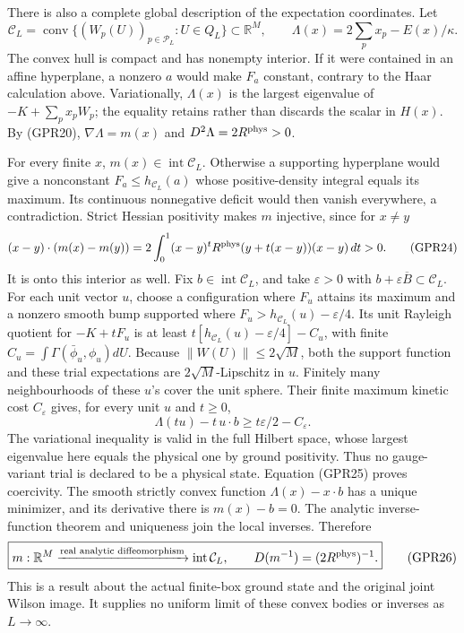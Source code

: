 \documentclass[11pt]{article}
\begin{document}
There is also a complete global description of the expectation coordinates. Let
\[
 \mathcal C_L=\operatorname{conv}\{(W_p(U))_{p\in\mathcal P_L}:U\in Q_L\}\subset\mathbb R^M,
 \qquad \Lambda(x)=2\sum_px_p-E(x)/\kappa.
 \tag{GPR23}
\]
The convex hull is compact and has nonempty interior. If it were contained in an affine hyperplane, a nonzero \(a\) would make \(F_a\) constant, contrary to the Haar calculation above. Variationally, \(\Lambda(x)\) is the largest eigenvalue of \(-K+\sum_px_pW_p\); the equality retains rather than discards the scalar in \(H(x)\). By (GPR20), \(\nabla\Lambda=m(x)\) and \(D^2\Lambda=2R^{\rm phys}>0\).

For every finite \(x\), \(m(x)\in\operatorname{int}\mathcal C_L\). Otherwise a supporting hyperplane would give a nonconstant \(F_a\le h_{\mathcal C_L}(a)\) whose positive-density integral equals its maximum. Its continuous nonnegative deficit would then vanish everywhere, a contradiction. Strict Hessian positivity makes \(m\) injective, since for \(x\ne y\)
\[
 (x-y)\cdot(m(x)-m(y))
 =2\int_0^1(x-y)^tR^{\rm phys}(y+t(x-y))(x-y)\,dt>0.
 \tag{GPR24}
\]
It is onto this interior as well. Fix \(b\in\operatorname{int}\mathcal C_L\), and take \(\varepsilon>0\) with \(b+\varepsilon\overline B\subset\mathcal C_L\). For each unit vector \(u\), choose a configuration where \(F_u\) attains its maximum and a nonzero smooth bump supported where \(F_u>h_{\mathcal C_L}(u)-\varepsilon/4\). Its unit Rayleigh quotient for \(-K+tF_u\) is at least \(t[h_{\mathcal C_L}(u)-\varepsilon/4]-C_u\), with finite \(C_u=\int\Gamma(\bar\phi_u,\phi_u)dU\). Because \(\|W(U)\|\le2\sqrt M\), both the support function and these trial expectations are \(2\sqrt M\)-Lipschitz in \(u\). Finitely many neighbourhoods of these \(u\)'s cover the unit sphere. Their finite maximum kinetic cost \(C_\varepsilon\) gives, for every unit \(u\) and \(t\ge0\),
\[
 \Lambda(tu)-t\,u\cdot b\ge t\varepsilon/2-C_\varepsilon.
 \tag{GPR25}
\]
The variational inequality is valid in the full Hilbert space, whose largest eigenvalue here equals the physical one by ground positivity. Thus no gauge-variant trial is declared to be a physical state. Equation (GPR25) proves coercivity. The smooth strictly convex function \(\Lambda(x)-x\cdot b\) has a unique minimizer, and its derivative there is \(m(x)-b=0\). The analytic inverse-function theorem and uniqueness join the local inverses. Therefore
\[
 \boxed{m:\mathbb R^M\xrightarrow{\text{real analytic diffeomorphism}}
                   \operatorname{int}\mathcal C_L,\qquad
 D(m^{-1})=(2R^{\rm phys})^{-1}.}
 \tag{GPR26}
\]
This is a result about the actual finite-box ground state and the original joint Wilson image. It supplies no uniform limit of these convex bodies or inverses as \(L\to\infty\).
\end{document}
